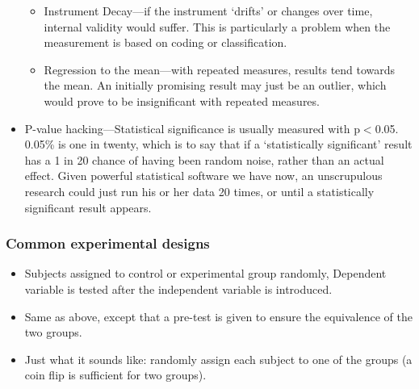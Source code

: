 \begin{refsection}
\begin{itemize}
\begin{itemize}
\item Instrument Decay---if the instrument `drifts' or changes over time, internal validity would suffer. This is particularly a problem when the measurement is based on coding or classification.

\item Regression to the mean---with repeated measures, results tend towards the mean. An initially promising result may just be an outlier, which would prove to be insignificant with repeated measures.

\end{itemize}

\item P-value hacking---Statistical significance is usually measured with p$<$0.05. 0.05\% is one in twenty, which is to say that if a `statistically significant' result has a 1 in 20 chance of having been random noise, rather than an actual effect. Given powerful statistical software we have now, an unscrupulous research could just run his or her data 20 times, or until a statistically significant result appears.

\end{itemize}

\subsubsection{Common experimental designs}
\label{commonexperimentaldesigns}


\begin{itemize}
\item Subjects assigned to control or experimental group randomly, Dependent variable is tested after the independent variable is introduced.

\end{itemize}


\begin{itemize}
\item Same as above, except that a pre-test is given to ensure the equivalence of the two groups.

\end{itemize}


\begin{itemize}
\item Just what it sounds like: randomly assign each subject to one of the groups (a coin flip is sufficient for two groups).


\end{itemize}
\end{refsection}
